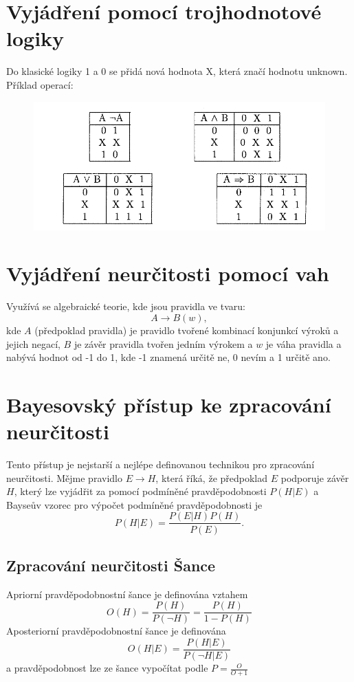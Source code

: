 \documentclass[12pt]{article}
\begin{document}
\section{Vyjádření pomocí trojhodnotové logiky}
Do klasické logiky 1 a 0 se přidá nová hodnota X, která značí hodnotu unknown. Příklad operací:
\begin{figure}[ht]
\centering
\includegraphics[width=0.5\linewidth]{logika}
\end{figure} 

\section{Vyjádření neurčitosti pomocí vah}
Využívá se algebraické teorie, kde jsou pravidla ve tvaru:
\begin{equation}
A\rightarrow B(w),
\end{equation}
kde $A$ (předpoklad pravidla) je pravidlo tvořené kombinací konjunkcí výroků a jejich negací, $B$ je závěr pravidla tvořen jedním výrokem a $w$ je váha pravidla a nabývá hodnot od -1 do 1, kde -1 znamená určitě ne, 0 nevím a 1 určitě ano.

\section{Bayesovský přístup ke zpracování neurčitosti}
Tento přístup je nejstarší a nejlépe definovanou technikou pro zpracování neurčitosti. Mějme pravidlo $E\rightarrow H$, která říká, že předpoklad $E$ podporuje závěr $H$, který lze vyjádřit za pomocí podmíněné pravdě\-podobnosti $P(H|E)$ a Bayseův vzorec pro výpočet podmíněné pravdě\-podobnosti je
\begin{equation}
P(H|E)=\frac{P(E|H)P(H)}{P(E)}.
\end{equation}

\subsection{Zpracování neurčitosti Šance}
Apriorní pravděpodobnostní šance je definována vztahem
\begin{equation}
O(H)=\frac{P(H)}{P(\lnot H)}=\frac{P(H)}{1-P(H)}
\end{equation}
Aposteriorní pravděpodobnostní šance je definována
\begin{equation}
O(H|E)=\frac{P(H|E)}{P(\lnot H|E)}
\end{equation}
a pravděpodobnost lze ze šance vypočítat podle $P=\frac{O}{O+1}$
\end{document}
